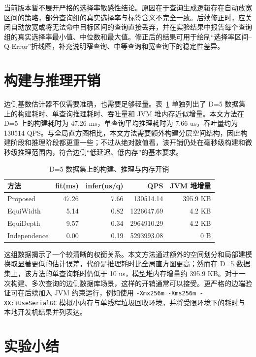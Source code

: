 当前版本暂不展开严格的选择率敏感性结论。原因在于查询生成逻辑存在自动放宽区间的策略，部分查询组的真实选择率与标签含义不完全一致。后续修正时，应关闭自动放宽或将无法命中目标区间的查询直接丢弃，并在实验结果中报告每个查询组的真实选择率最小值、中位数和最大值。修正后的结果可用于绘制“选择率区间--Q-Error”折线图，补充说明窄查询、中等查询和宽查询下的稳定性差异。

\section{构建与推理开销}

边侧基数估计器不仅需要准确，也需要足够轻量。表~\ref{tab:cost} 单独列出了 D=5 数据集上的构建耗时、单查询推理耗时、吞吐量和 JVM 堆内存近似增量。本文方法在 D=5 上的构建耗时为 47.26 ms，单查询平均推理耗时为 7.66 us，吞吐量约为 130514 QPS。与全局直方图相比，本文方法需要额外构建分层空间结构，因此构建阶段和推理阶段都更重一些；不过从绝对数值看，该开销仍处在毫秒级构建和微秒级推理范围内，符合边侧“低延迟、低内存”的基本要求。

\begin{table}[htbp]
  \centering
  \caption{D=5 数据集上的构建、推理与内存开销}
  \label{tab:cost}
  \begin{tabular}{lrrrr}
    \hline
    方法 & fit(ms) & infer(us/q) & QPS & JVM 堆增量 \\
    \hline
    Proposed & 47.26 & 7.66 & 130514.14 & 395.9 KB \\
    EquiWidth & 5.14 & 0.82 & 1226647.69 & 4.2 KB \\
    EquiDepth & 9.57 & 0.34 & 2964910.29 & 4.2 KB \\
    Independence & 0.00 & 0.19 & 5293993.08 & 0 B \\
    \hline
  \end{tabular}
\end{table}

这组数据揭示了一个较清晰的权衡关系。本文方法通过额外的空间划分和局部建模换取显著更低的估计误差，代价是推理耗时比全局直方图更高；然而在 D=5 数据集上，该方法的单查询耗时仍低于 10 us，模型堆内存增量约 395.9 KB。对于一次构建、多次查询的边侧数据库场景，这样的开销通常可以接受。更严格的边端验证可在后续加入 JVM 约束运行，例如使用 \texttt{-Xmx256m -Xms256m -XX:+UseSerialGC} 模拟小内存与单线程垃圾回收环境，并将受限环境下的耗时与本地开发机结果并列表达。

\section{实验小结}

